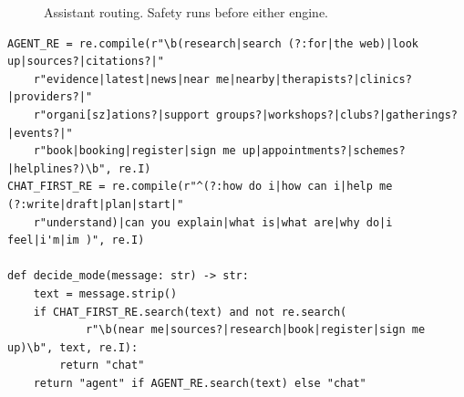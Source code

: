 \documentclass[11pt,a4paper]{article}
\newcommand{\code}[1]{\texttt{#1}}
\begin{document}
\begin{figure}[H]
\centering
{}
\caption{Assistant routing. Safety runs before either engine.}
\label{fig:routing}
\end{figure}

\par\noindent\begin{minipage}{\linewidth}\begin{lstlisting}[caption={Auto-routing between chat and the agent (\code{nbapp/assistant.py}, shortened).},label={lst:route}]
AGENT_RE = re.compile(r"\b(research|search (?:for|the web)|look up|sources?|citations?|"
    r"evidence|latest|news|near me|nearby|therapists?|clinics?|providers?|"
    r"organi[sz]ations?|support groups?|workshops?|clubs?|gatherings?|events?|"
    r"book|booking|register|sign me up|appointments?|schemes?|helplines?)\b", re.I)
CHAT_FIRST_RE = re.compile(r"^(?:how do i|how can i|help me (?:write|draft|plan|start|"
    r"understand)|can you explain|what is|what are|why do|i feel|i'm|im )", re.I)

def decide_mode(message: str) -> str:
    text = message.strip()
    if CHAT_FIRST_RE.search(text) and not re.search(
            r"\b(near me|sources?|research|book|register|sign me up)\b", text, re.I):
        return "chat"
    return "agent" if AGENT_RE.search(text) else "chat"
\end{lstlisting}\end{minipage}\par
\end{document}
